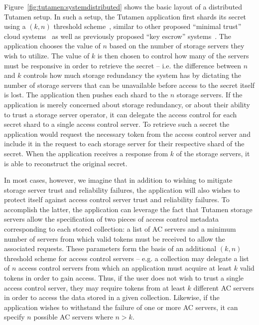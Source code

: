 Figure~\ref{fig:tutamen:systemdistributed} shows the basic layout of a
distributed Tutamen setup. In such a setup, the Tutamen application
first shards its secret using a $(k, n)$ threshold
scheme~\cite{shamir1979, krawczyk1993}, similar to other proposed
``minimal trust'' cloud systems~\cite{bessani2011} as well as
previously proposed ``key escrow'' systems~\cite{blaze1996,
  denning1996}. The application chooses the value of $n$ based on the
number of storage servers they wish to utilize. The value of $k$ is
then chosen to control how many of the servers must be responsive in
order to retrieve the secret -- i.e. the difference between $n$ and
$k$ controls how much storage redundancy the system has by dictating
the number of storage servers that can be unavailable before access to
the secret itself is lost. The application then pushes each shard to
the $n$ storage servers. If the application is merely concerned about
storage redundancy, or about their ability to trust a storage server
operator, it can delegate the access control for each secret shard to
a single access control server. To retrieve such a secret the
application would request the necessary token from the access control
server and include it in the request to each storage server for their
respective shard of the secret. When the application receives a
response from $k$ of the storage servers, it is able to reconstruct
the original secret.

In most cases, however, we imagine that in addition to wishing to
mitigate storage server trust and reliability failures, the
application will also wishes to protect itself against access control
server trust and reliability failures. To accomplish the latter, the
application can leverage the fact that Tutamen storage servers allow
the specification of two pieces of access control metadata
corresponding to each stored collection: a list of AC servers and a
minimum number of servers from which valid tokens must be received to
allow the associated requests. These parameters form the basis of an
additional $(k, n)$ threshold scheme for access control servers --
e.g. a collection may delegate a list of $n$ access control servers
from which an application must acquire at least $k$ valid tokens in
order to gain access. Thus, if the user does not wish to trust a
single access control server, they may require tokens from at least
$k$ different AC servers in order to access the data stored in a given
collection. Likewise, if the application wishes to withstand the
failure of one or more AC servers, it can specify $n$ possible AC
servers where $n > k$.

